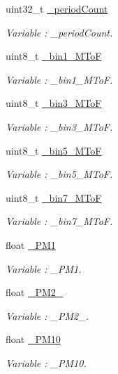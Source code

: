 \begin{DoxyCompactItemize}
uint32\+\_\+t \hyperlink{class_wasp_o_p_c___n2_a869484eaea2d0a63a403edf08c8cc894}{\+\_\+period\+Count}
\begin{DoxyCompactList}\small\item\em Variable \+: \+\_\+period\+Count. \end{DoxyCompactList}\item 
uint8\+\_\+t \hyperlink{class_wasp_o_p_c___n2_aa2fb33126d694778465b577b74b252b0}{\+\_\+bin1\+\_\+\+M\+ToF}
\begin{DoxyCompactList}\small\item\em Variable \+: \+\_\+bin1\+\_\+\+M\+ToF. \end{DoxyCompactList}\item 
uint8\+\_\+t \hyperlink{class_wasp_o_p_c___n2_a308f3f4e70570095d070c971f37a3427}{\+\_\+bin3\+\_\+\+M\+ToF}
\begin{DoxyCompactList}\small\item\em Variable \+: \+\_\+bin3\+\_\+\+M\+ToF. \end{DoxyCompactList}\item 
uint8\+\_\+t \hyperlink{class_wasp_o_p_c___n2_a244d0de94d842fb2b9f351968b096c53}{\+\_\+bin5\+\_\+\+M\+ToF}
\begin{DoxyCompactList}\small\item\em Variable \+: \+\_\+bin5\+\_\+\+M\+ToF. \end{DoxyCompactList}\item 
uint8\+\_\+t \hyperlink{class_wasp_o_p_c___n2_a23fdf0a61206d2e29494633c095651ed}{\+\_\+bin7\+\_\+\+M\+ToF}
\begin{DoxyCompactList}\small\item\em Variable \+: \+\_\+bin7\+\_\+\+M\+ToF. \end{DoxyCompactList}\item 
float \hyperlink{class_wasp_o_p_c___n2_aab45afc9b5e75d5c14aa405ea90beb91}{\+\_\+\+P\+M1}
\begin{DoxyCompactList}\small\item\em Variable \+: \+\_\+\+P\+M1. \end{DoxyCompactList}\item 
float \hyperlink{class_wasp_o_p_c___n2_a3253bd865b9ff280335c4a795c9f474d}{\+\_\+\+P\+M2\+\_}
\begin{DoxyCompactList}\small\item\em Variable \+: \+\_\+\+P\+M2\+\_. \end{DoxyCompactList}\item 
float \hyperlink{class_wasp_o_p_c___n2_a165a813a96afdbdeeaf506e877bf02c3}{\+\_\+\+P\+M10}
\begin{DoxyCompactList}\small\item\em Variable \+: \+\_\+\+P\+M10. \end{DoxyCompactList}\end{DoxyCompactItemize}


